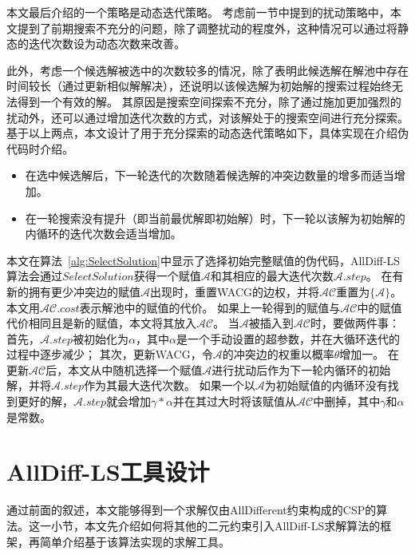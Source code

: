 本文最后介绍的一个策略是动态迭代策略。
考虑前一节中提到的扰动策略中，本文提到了前期搜索不充分的问题，除了调整扰动的程度外，这种情况可以通过将静态的迭代次数设为动态次数来改善。

此外，考虑一个候选解被选中的次数较多的情况，除了表明此候选解在解池中存在时间较长（通过更新相似解解决），还说明以该候选解为初始解的搜索过程始终无法得到一个有效的解。
其原因是搜索空间探索不充分，除了通过施加更加强烈的扰动外，还可以通过增加迭代次数的方式，对该解处于的搜索空间进行充分探索。基于以上两点，本文设计了用于充分探索的动态迭代策略如下，具体实现在介绍伪代码时介绍。
\begin{itemize}
    \item 在选中候选解后，下一轮迭代的次数随着候选解的冲突边数量的增多而适当增加。
    \item 在一轮搜索没有提升（即当前最优解即初始解）时，下一轮以该解为初始解的内循环的迭代次数会适当增加。
\end{itemize}

本文在算法~\ref{alg:SelectSolution}中显示了选择初始完整赋值的伪代码，AllDiff-LS算法会通过$SelectSolution$获得一个赋值$\mathcal{A}$和其相应的最大迭代次数$\mathcal{A}.step$。
在有新的拥有更少冲突边的赋值$\mathcal{A}$出现时，重置WACG的边权，并将$\mathcal{AC}$重置为$\{\mathcal{A}\}$。
本文用$\mathcal{AC}.cost$表示解池中的赋值的代价。
如果上一轮得到的赋值与$\mathcal{AC}$中的赋值代价相同且是新的赋值，本文将其放入$\mathcal{AC}$。
当$\mathcal{A}$被插入到$\mathcal{AC}$时，要做两件事：
首先，$\mathcal{A}.step$被初始化为$\alpha$，其中$\alpha$是一个手动设置的超参数，并在大循环迭代的过程中逐步减少；
其次，更新WACG，令$\mathcal{A}$的冲突边的权重以概率$\theta$增加一。
在更新$\mathcal{AC}$后，本文从中随机选择一个赋值$\mathcal{A}$进行扰动后作为下一轮内循环的初始解，并将$\mathcal{A}.step$作为其最大迭代次数。
如果一个以$\mathcal{A}$为初始赋值的内循环没有找到更好的解，$\mathcal{A}.step$就会增加$\gamma*\alpha$并在其过大时将该赋值从$\mathcal{AC}$中删掉，其中$\gamma$和$\alpha$是常数。

\section{AllDiff-LS工具设计}
通过前面的叙述，本文能够得到一个求解仅由AllDifferent约束构成的CSP的算法。这一小节，本文先介绍如何将其他的二元约束引入AllDiff-LS求解算法的框架，再简单介绍基于该算法实现的求解工具。

